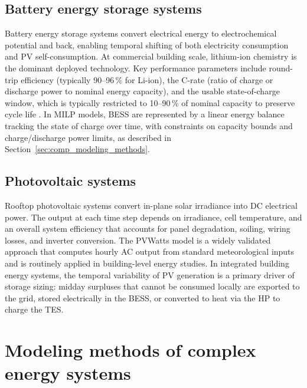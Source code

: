\documentclass[11pt,a4paper]{report}
\begin{document}
\subsection{Battery energy storage systems}
\label{sub:lit_bess_overview}

Battery energy storage systems convert electrical energy to electrochemical potential and back, enabling temporal shifting of both electricity consumption and PV self-consumption.
At commercial building scale, lithium-ion chemistry is the dominant deployed technology.
Key performance parameters include round-trip efficiency (typically 90--96\,\% for Li-ion), the C-rate (ratio of charge or discharge power to nominal energy capacity), and the usable state-of-charge window, which is typically restricted to 10--90\,\% of nominal capacity to preserve cycle life \cite{Gabrielli2018Electrochemical}.
In MILP models, BESS are represented by a linear energy balance tracking the state of charge over time, with constraints on capacity bounds and charge/discharge power limits, as described in Section~\ref{sec:comp_modeling_methods}.

\subsection{Photovoltaic systems}
\label{sub:lit_pv_overview}

Rooftop photovoltaic systems convert in-plane solar irradiance into DC electrical power.
The output at each time step depends on irradiance, cell temperature, and an overall system efficiency that accounts for panel degradation, soiling, wiring losses, and inverter conversion.
The PVWatts model \cite{Dobos2014PVWatts} is a widely validated approach that computes hourly AC output from standard meteorological inputs and is routinely applied in building-level energy studies.
In integrated building energy systems, the temporal variability of PV generation is a primary driver of storage sizing: midday surpluses that cannot be consumed locally are exported to the grid, stored electrically in the BESS, or converted to heat via the HP to charge the TES.

\section{Modeling methods of complex energy systems}
\label{sec:lit_modeling_methods}
\end{document}
